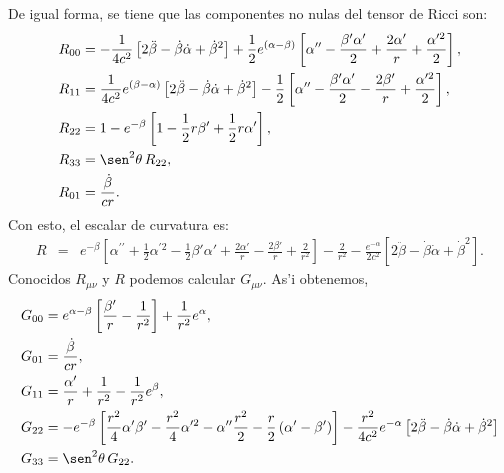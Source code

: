 De igual forma, se tiene que las componentes no nulas del tensor de Ricci son:
\begin{align}
R_{00} & =-\frac{1}{4c^2}\left[ 2\ddot{\beta}-\dot{\beta}\dot{\alpha}%
+\dot{\beta}^2\right] +\frac{1}2e^{(\alpha-\beta)}
\left[\alpha^{\prime\prime}-\frac{\beta'\alpha'}{2}+\frac{2\alpha'}%
{r}+\frac{\alpha^{\prime2}}2\right] \label{ricci00},\\
R_{11} & =\frac{1}{4c^2}e^{(\beta-\alpha)} \left[ 2\ddot{\beta}%
-\dot{\beta}\dot{\alpha}+\dot{\beta}^2\right] -\frac{1}2\left[
\alpha^{\prime\prime}-\frac{\beta'\alpha'}2-\frac{2\beta'%
}{r}+\frac{\alpha^{\prime2}}2\right] ,\label{ricci11}\\
R_{22} & =1-e^{-\beta} \left[ 1-\frac{1}2r\beta
'+\frac{1}2r\alpha'\right] ,\label{ricci22}\\
R_{33} & =\sen^2\theta\, R_{22} ,\label{ricci33}\\
R_{01} &= \frac{\dot{\beta}}{cr}.\label{ricci01}
\end{align}
Con esto, el escalar de curvatura es:
\begin{eqnarray}
R &=& e^{-\beta}\left[
\alpha^{\prime\prime}+\frac{1}{2}\alpha^{\prime2}-\frac{1}2\beta'\alpha'+\frac{
2\alpha'}{r}-\frac{2\beta'}{r} +\frac2{r^2}\right] -\frac2{r^2}
-\frac{e^{-\alpha}}{2c^2} \left[ 2\ddot{\beta}-\dot{\beta}%
\dot{\alpha}+\dot{\beta}^2\right].
\end{eqnarray}
Conocidos $R_{\mu\nu}$ y $R$ podemos calcular $G_{\mu\nu}$. As'i obtenemos,
\begin{align}
G_{00} & =e^{\alpha-\beta}\left[ \frac{\beta'}{r}-\frac{1}{r^2}\right]
+\frac{1}{r^2}e^\alpha, \\
G_{01} &= \frac{\dot{\beta}}{cr},\label{g01b}\\
G_{11} &=\frac{\alpha'}{r}+\frac{1}{r^2}-\frac{1}{r^2}e^{\beta} ,\label{g11}\\
G_{22} & =-e^{-\beta} \left[ \frac{r^2}{4}\alpha^{\prime
}\beta'-\frac{r^2}{4}\alpha^{\prime2}-\alpha^{\prime\prime}\frac{r^2}{2}-\frac{r}{2}\left( \alpha^{\prime}-\beta'\right) \right] -\frac{r^2}{4c^2}e^{-\alpha}\left[2\ddot{\beta}-\dot{\beta}\dot{\alpha}
+\dot{\beta}^2\right] \\
G_{33} & =\sen^2\theta\, G_{22}.
\end{align}


